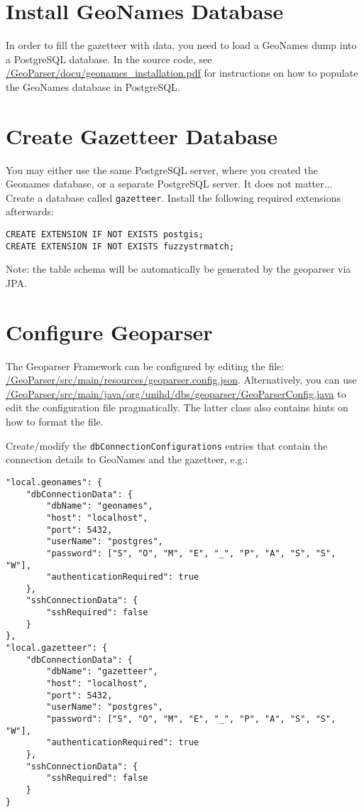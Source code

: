 \documentclass[fontsize=12pt, BCOR=10mm, DIV=14, parskip=true,headings=small]{scrartcl}
\begin{document}
\section{Install GeoNames Database}
In order to fill the gazetteer with data, you need to load a GeoNames dump into a PostgreSQL database. In the source code, see \url{/GeoParser/docu/geonames_installation.pdf} for instructions on how to populate the GeoNames database in PostgreSQL.

\section{Create Gazetteer Database}
You may either use the same PostgreSQL server, where you created the Geonames database, or a separate PostgreSQL server. It does not matter...
Create a database called \texttt{gazetteer}. Install the following required extensions afterwards:

\begin{lstlisting}
CREATE EXTENSION IF NOT EXISTS postgis;
CREATE EXTENSION IF NOT EXISTS fuzzystrmatch;
\end{lstlisting}

Note: the table schema will be automatically be generated by the geoparser via JPA.

\section{Configure Geoparser}
The Geoparser Framework can be configured by editing the file: \url{/GeoParser/src/main/resources/geoparser.config.json}. Alternatively, you can use \url{/GeoParser/src/main/java/org/unihd/dbs/geoparser/GeoParserConfig.java} to edit the configuration file pragmatically. The latter class also contains hints on how to format the file.

Create/modify the \texttt{dbConnectionConfigurations} entries that contain the connection details to GeoNames and the gazetteer, e.g.:

\begin{lstlisting}
"local.geonames": {
    "dbConnectionData": {
        "dbName": "geonames",
        "host": "localhost",
        "port": 5432,
        "userName": "postgres",
        "password": ["S", "O", "M", "E", "_", "P", "A", "S", "S", "W"],
        "authenticationRequired": true
    },
    "sshConnectionData": {
        "sshRequired": false
    }
},
"local.gazetteer": {
    "dbConnectionData": {
        "dbName": "gazetteer",
        "host": "localhost",
        "port": 5432,
        "userName": "postgres",
        "password": ["S", "O", "M", "E", "_", "P", "A", "S", "S", "W"],
        "authenticationRequired": true
    },
    "sshConnectionData": {
        "sshRequired": false
    }
}
\end{lstlisting}
\end{document}
